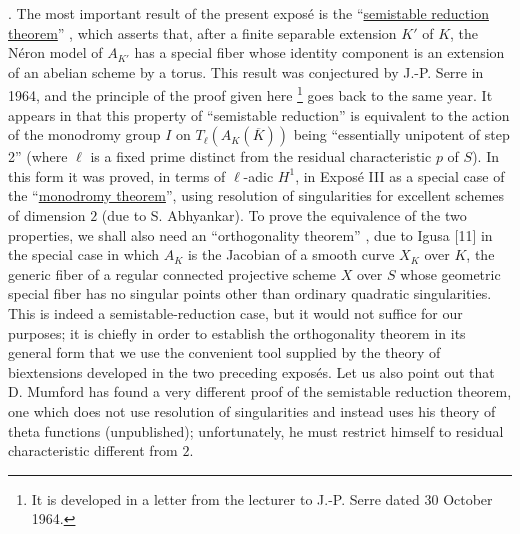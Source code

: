 . The most important result of the present expos\'e is the
``\underline{semistable reduction theorem}'' , which asserts that,
after a finite separable extension $K'$ of $K$, the N\'eron model of
$A_{K'}$ has a special fiber whose identity component is an extension
of an abelian scheme by a torus. This result was conjectured by
J.-P. Serre in 1964, and the principle of the proof given here
\footnote{It is developed in a letter from the lecturer to J.-P. Serre
dated 30 October 1964.}
goes back to the same year. It appears in  that this property of
``semistable reduction'' is equivalent to the action of the monodromy
group $I$ on $T_\ell(A_K(\overline K))$ being ``essentially unipotent
of step 2'' (where $\ell$ is a fixed prime distinct from the residual
characteristic $p$ of $S$). In this form it was proved, in terms of
$\ell$-adic $H^1$, in Expos\'e III as a special case of the
``\underline{monodromy theorem}'', using resolution of singularities
for excellent schemes of dimension $2$ (due to S. Abhyankar). To prove
the equivalence of the two properties, we shall also need an
``orthogonality theorem'' , due to Igusa [11] in the special case in
which $A_K$ is the Jacobian of a smooth curve $X_K$ over $K$, the
generic fiber of a regular connected projective scheme $X$ over $S$
whose geometric special fiber has no singular points other than
ordinary quadratic singularities. This is indeed a semistable-reduction
case, but it would not suffice for our purposes; it is chiefly in order
to establish the orthogonality theorem in its general form that we use
the convenient tool supplied by the theory of biextensions developed
in the two preceding expos\'es. Let us also point out that D. Mumford
has found a very different proof of the semistable reduction theorem,
one which does not use resolution of singularities and instead uses
his theory of theta functions (unpublished); unfortunately, he must
restrict himself to residual characteristic different from $2$.

